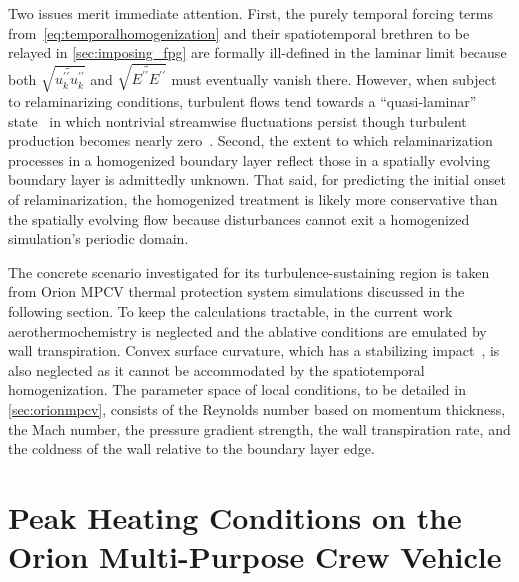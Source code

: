 Two issues merit immediate attention.  First, the purely temporal forcing terms
from~\eqref{eq:temporalhomogenization} and their spatiotemporal brethren to be
relayed in \autoref{sec:imposing_fpg} are formally ill-defined in the laminar
limit because both $\sqrt{\widetilde{u^{\prime\prime}_k u^{\prime\prime}_k}}$ and
$\sqrt{\widetilde{E^{\prime\prime} E^{\prime\prime}}}$ must eventually vanish there.
However, when subject to relaminarizing conditions, turbulent flows tend
towards a ``quasi-laminar'' state~\citep{Sreenivasan1982Laminarescent} in which
nontrivial streamwise fluctuations persist though turbulent production becomes
nearly zero~\citep{Cal2008Similarity}.  Second, the extent to which
relaminarization processes in a homogenized boundary layer reflect those
in a spatially evolving boundary layer is admittedly unknown.  That said, for
predicting the initial onset of relaminarization, the homogenized treatment is
likely more conservative than the spatially evolving flow because disturbances
cannot exit a homogenized simulation's periodic domain.

The concrete scenario investigated for its turbulence-sustaining region is
taken from Orion MPCV thermal protection system simulations discussed
in the following section.  To keep the calculations tractable, in
the current work aerothermochemistry is neglected and the ablative
conditions are emulated by wall transpiration.  Convex surface curvature,
which has a stabilizing impact~\citep{Bowersox1996Turbulence}, is
also neglected as it cannot be accommodated by the spatiotemporal
homogenization.  The parameter space of local conditions, to be detailed
in \autoref{sec:orionmpcv}, consists of the Reynolds number
based on momentum thickness, the Mach number, the pressure gradient
strength, the wall transpiration rate, and the coldness of the wall
relative to the boundary layer edge.

\section[Peak Heating Conditions on the Orion Multi-Purpose Crew Vehicle]
        {Peak Heating Conditions on the\\Orion Multi-Purpose Crew Vehicle}
\label{sec:orionmpcv}

